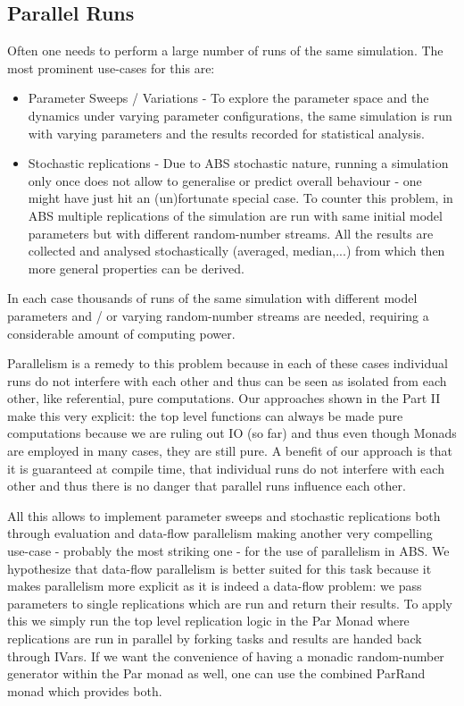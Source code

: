 \subsection{Parallel Runs}
Often one needs to perform a large number of runs of the same simulation. The most prominent use-cases for this are:

\begin{itemize}
	\item Parameter Sweeps / Variations - To explore the parameter space and the dynamics under varying parameter configurations, the same simulation is run with varying parameters and the results recorded for statistical analysis.
	
	\item Stochastic replications - Due to ABS stochastic nature, running a simulation only once does not allow to generalise or predict overall behaviour - one might have just hit an (un)fortunate special case. To counter this problem, in ABS multiple replications of the  simulation are run with same initial model parameters but with different random-number streams. All the results are collected and analysed stochastically (averaged, median,...) from which then more general properties can be derived.
\end{itemize}

In each case thousands of runs of the same simulation with different model parameters and / or varying random-number streams are needed, requiring a considerable amount of computing power.

Parallelism is a remedy to this problem because in each of these cases individual runs do not interfere with each other and thus can be seen as isolated from each other, like referential, pure computations. Our approaches shown in the Part II make this very explicit: the top level functions can always be made pure computations because we are ruling out IO (so far) and thus even though Monads are employed in many cases, they are still pure. A benefit of our approach is that it is guaranteed at compile time, that individual runs do not interfere with each other and thus there is no danger that parallel runs influence each other. 

All this allows to implement parameter sweeps and stochastic replications both through evaluation and data-flow parallelism making another very compelling use-case - probably the most striking one - for the use of parallelism in ABS. We hypothesize that data-flow parallelism is better suited for this task because it makes parallelism more explicit as it is indeed a data-flow problem: we pass parameters to single replications which are run and return their results. To apply this we simply run the top level replication logic in the Par Monad where replications are run in parallel by forking tasks and results are handed back through IVars. If we want the convenience of having a monadic random-number generator within the Par monad as well, one can use the combined ParRand monad which provides both.